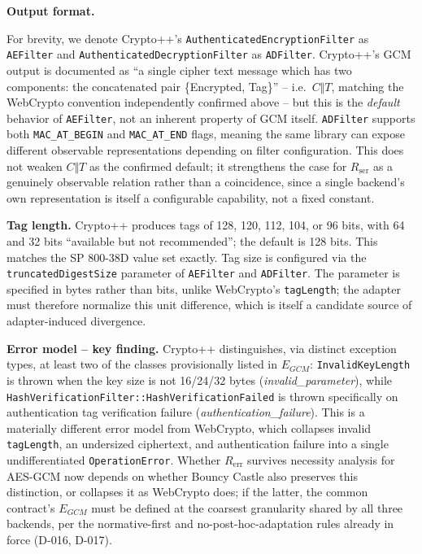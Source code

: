 \documentclass[11pt,a4paper]{article}
\begin{document}
\textbf{Output format.} 
\begin{sloppypar}
For brevity, we denote Crypto++'s
\texttt{AuthenticatedEncryptionFilter} as \texttt{AEFilter} and
\texttt{AuthenticatedDecryptionFilter} as \texttt{ADFilter}. Crypto++'s GCM output is documented as ``a single cipher text message which has two components: the concatenated pair \{Encrypted, Tag\}'' -- i.e.\ $C\Vert T$, matching the WebCrypto convention independently confirmed above -- but this is the \emph{default} behavior of \texttt{AEFilter}, not an inherent property of GCM itself. \texttt{ADFilter} supports both \texttt{MAC\_AT\_BEGIN} and \texttt{MAC\_AT\_END} flags, meaning the same library can expose different observable representations depending on filter configuration. This does not weaken $C\Vert T$ as the confirmed default; it strengthens the case for $R_{\text{ser}}$ as a genuinely observable relation rather than a coincidence, since a single backend's own representation is itself a configurable capability, not a fixed constant.
\end{sloppypar}

\textbf{Tag length.} Crypto++ produces tags of 128, 120, 112, 104, or 96 bits, with 64 and 32 bits ``available but not recommended''; the default is 128 bits. This matches the SP 800-38D value set exactly. Tag size is configured via the \texttt{truncatedDigestSize} parameter of \texttt{AEFilter} and \texttt{ADFilter}. The parameter is specified in bytes rather than bits, unlike WebCrypto's \texttt{tagLength}; the adapter must therefore normalize this unit difference, which is itself a candidate source of adapter-induced divergence.

\textbf{Error model -- key finding.} Crypto++ distinguishes, via distinct exception types, at least two of the classes provisionally listed in $E_{GCM}$: \texttt{InvalidKeyLength} is thrown when the key size is not 16/24/32 bytes (\emph{invalid\_parameter}), while \texttt{HashVerificationFilter::HashVerificationFailed} is thrown specifically on authentication tag verification failure (\emph{authentication\_failure}). This is a materially different error model from WebCrypto, which collapses invalid \texttt{tagLength}, an undersized ciphertext, and authentication failure into a single undifferentiated \texttt{OperationError}. Whether $R_{\text{err}}$ survives necessity analysis for AES-GCM now depends on whether Bouncy Castle also preserves this distinction, or collapses it as WebCrypto does; if the latter, the common contract's $E_{GCM}$ must be defined at the coarsest granularity shared by all three backends, per the normative-first and no-post-hoc-adaptation rules already in force (D-016, D-017).
\end{document}
